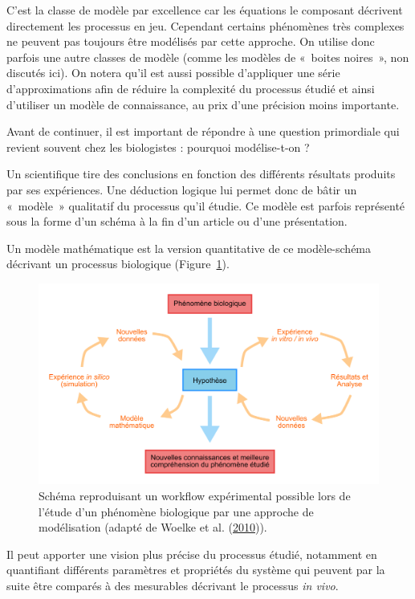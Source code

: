 \documentclass[12pt,a4paper,twoside,openright]{book}
\begin{document}
C'est la classe de modèle par excellence car les équations le composant
décrivent directement les processus en jeu. Cependant certains
phénomènes très complexes ne peuvent pas toujours être modélisés par
cette approche. On utilise donc parfois une autre classes de modèle
(comme les modèles de «~boites noires~», non discutés ici). On notera
qu'il est aussi possible d'appliquer une série d'approximations afin de
réduire la complexité du processus étudié et ainsi d'utiliser un modèle
de connaissance, au prix d'une précision moins importante.

Avant de continuer, il est important de répondre à une question
primordiale qui revient souvent chez les biologistes : pourquoi
modélise-t-on ?

Un scientifique tire des conclusions en fonction des différents
résultats produits par ses expériences. Une déduction logique lui permet
donc de bâtir un «~modèle~» qualitatif du processus qu'il étudie. Ce
modèle est parfois représenté sous la forme d'un schéma à la fin d'un
article ou d'une présentation.

Un modèle mathématique est la version quantitative de ce modèle-schéma
décrivant un processus biologique (Figure~\ref{fig:modelling}).

\begin{figure}[htbp]
\centering
\includegraphics{figures/intro/modelling.png}
\caption{\label{fig:modelling}Schéma reproduisant un workflow
expérimental possible lors de l'étude d'un phénomène biologique par une
approche de modélisation (adapté de Woelke et al.
(\protect\hyperlink{ref-Woelke2010}{2010})).}
\end{figure}

Il peut apporter une vision plus précise du processus étudié, notamment
en quantifiant différents paramètres et propriétés du système qui
peuvent par la suite être comparés à des mesurables décrivant le
processus \emph{in vivo}.
\end{document}
